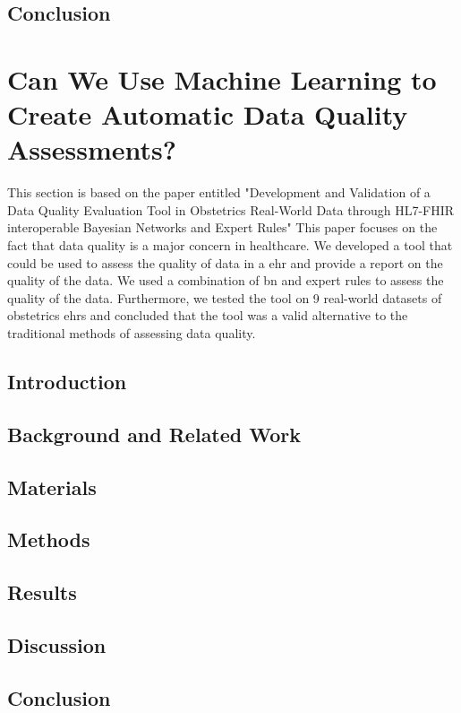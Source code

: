 \subsection{Conclusion}



\section{Can We Use Machine Learning to Create Automatic Data Quality Assessments?}\label{subsec:dq}
This section is based on the paper entitled "Development and Validation of a Data Quality Evaluation Tool in Obstetrics Real-World Data through HL7-FHIR interoperable Bayesian Networks and Expert Rules" This paper focuses on the fact that data quality is a major concern in healthcare. We developed a tool that could be used to assess the quality of data in a \ac{ehr} and provide a report on the quality of the data. We used a combination of \ac{bn} and expert rules to assess the quality of the data. Furthermore, we tested the tool on 9 real-world datasets of obstetrics \acp{ehr} and concluded that the tool was a valid alternative to the traditional methods of assessing data quality.
%
\subsection{Introduction}

\subsection{Background and Related Work}

\subsection{Materials}

\subsection{Methods}

\subsection{Results}

\subsection{Discussion}

\subsection{Conclusion}



